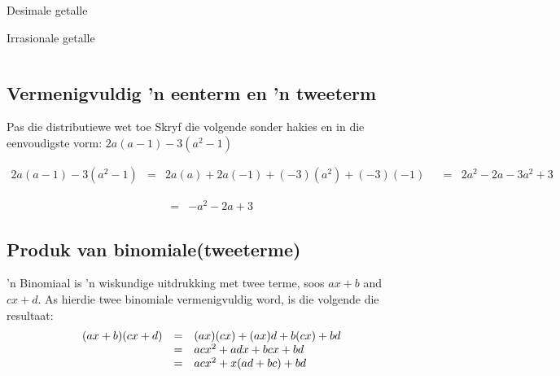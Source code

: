 \begin{Aktiwiteit}{Desimale getalle}
\begin{aktiwiteit}{Irrasionale getalle}
\begin{table}[H]
\begin{center}
\begin{tabular}{|l|l|}
\end{tabular}
\end{center}
\end{table} 

\par

\subsection*{Vermenigvuldig 'n eenterm en 'n tweeterm}

\begin{wex}{Pas die distributiewe wet toe}
{Skryf die volgende sonder hakies en in die eenvoudigste vorm: $2a(a-1) - 3(a^{2}-1)$}
{
\begin{equation*}
\begin{array}{lll} 2a(a-1) -3(a^{2}-1) &=& 2a(a) + 2a(-1) + (-3)(a^{2})+(-3)(-1) &
&=& 2a^{2} - 2a - 3a^{2} + 3
\end{array}
\end{equation*}

\begin{equation*}
\begin{array}{lll} &=& -a^{2} -2a + 3 & 
\end{array}
\end{equation*}
}
\end{wex}

\subsection*{Produk van binomiale(tweeterme)}

’n Binomiaal is ’n wiskundige uitdrukking met twee terme, soos $ax+b$ and $cx+d$. As hierdie twee binomiale
vermenigvuldig word, is die volgende die resultaat:
\begin{equation*}
\begin{array}{ccc}\hfill (ax+b)(cx+d) & =& (ax)(cx)+(ax)d+b(cx)+bd\hfill  \\
& =& ac{x}^{2}+adx +bcx+bd\hfill\\
& =& ac{x}^{2}+x(ad+bc)+bd\hfill \end{array}
\end{equation*}

\par


\end{aktiwiteit}
\end{Aktiwiteit}
